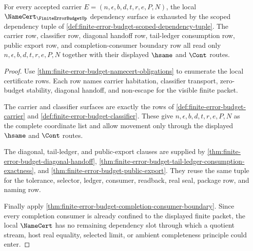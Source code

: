 \begin{theorem}
\label{thm:finite-error-budget-namecert-dependency-exhaustion}
For every accepted carrier $E=(n,\epsilon,b,d,t,r,e,P,N)$, the local
$\NameCert_{\FiniteErrorBudgetUp}$ dependency surface is exhausted by the
scoped dependency tuple of
\autoref{def:finite-error-budget-scoped-dependency-tuple}. The carrier row,
classifier row, diagonal handoff row, tail-ledger consumption row, public
export row, and completion-consumer boundary row all read only
$n,\epsilon,b,d,t,r,e,P,N$ together with their displayed $\hsame$ and $\Cont$
routes.
\end{theorem}
\begin{proof}
Use \autoref{thm:finite-error-budget-namecert-obligations} to enumerate the
local certificate rows. Each row names carrier habitation, classifier
transport, zero-budget stability, diagonal handoff, and non-escape for the
visible finite packet.

The carrier and classifier surfaces are exactly the rows of
\autoref{def:finite-error-budget-carrier} and
\autoref{def:finite-error-budget-classifier}. These give
$n,\epsilon,b,d,t,r,e,P,N$ as the complete coordinate list and allow movement
only through the displayed $\hsame$ and $\Cont$ routes.

The diagonal, tail-ledger, and public-export clauses are supplied by
\autoref{thm:finite-error-budget-diagonal-handoff},
\autoref{thm:finite-error-budget-tail-ledger-consumption-exactness}, and
\autoref{thm:finite-error-budget-public-export}. They reuse the same tuple for
the tolerance, selector, ledger, consumer, readback, real seal, package row,
and naming row.

Finally apply
\autoref{thm:finite-error-budget-completion-consumer-boundary}. Since every
completion consumer is already confined to the displayed finite packet, the
local $\NameCert$ has no remaining dependency slot through which a quotient
stream, host real equality, selected limit, or ambient completeness principle
could enter.
\end{proof}

